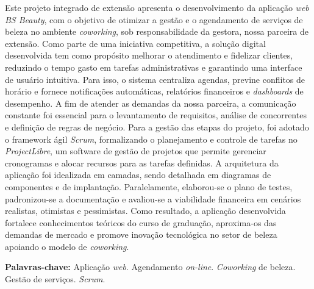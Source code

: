 	\begin{resumo}
	Este projeto integrado de extensão apresenta o desenvolvimento da aplicação \emph{web} \emph{BS Beauty}, com o objetivo de otimizar a gestão e o agendamento de serviços de beleza no ambiente \emph{coworking}, sob responsabilidade da gestora, nossa parceira de extensão. Como parte de uma iniciativa competitiva, a solução digital desenvolvida tem como propósito melhorar o atendimento e fidelizar clientes, reduzindo o tempo gasto em tarefas administrativas e garantindo uma interface de usuário intuitiva. Para isso, o sistema centraliza agendas, previne conflitos de horário e fornece notificações automáticas, relatórios financeiros e \emph{dashboards} de desempenho. A fim de atender as demandas da nossa parceira, a comunicação constante foi essencial para o levantamento de requisitos, análise de concorrentes e definição de regras de negócio. Para a gestão das etapas do projeto, foi adotado o framework ágil \emph{Scrum}, formalizando o planejamento e controle de tarefas no \emph{ProjectLibre}, um software de gestão de projetos que permite gerenciar cronogramas e alocar recursos para as tarefas definidas. A arquitetura da aplicação foi idealizada em camadas, sendo detalhada em diagramas de componentes e de implantação. Paralelamente, elaborou-se o plano de testes, padronizou-se a documentação e avaliou-se a viabilidade financeira em cenários realistas, otimistas e pessimistas. Como resultado, a aplicação desenvolvida fortalece conhecimentos teóricos do curso de graduação, aproxima-os das demandas de mercado e promove inovação tecnológica no setor de beleza apoiando o modelo de \emph{coworking}.

\textbf{Palavras-chave:} Aplicação \emph{web}. Agendamento \emph{on-line}. \emph{Coworking} de beleza. Gestão de serviços. \emph{Scrum}.

	\end{resumo}